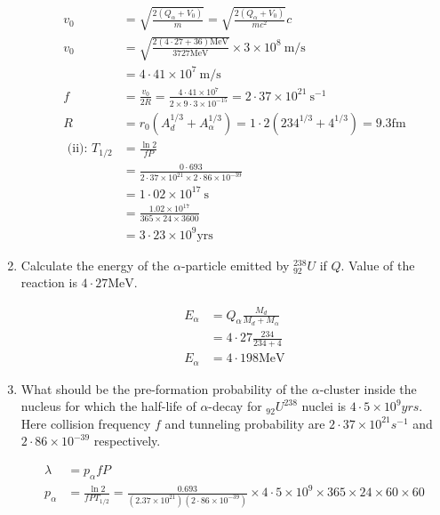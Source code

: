 \begin{enumerate}
\begin{answer}
\begin{align*}
		v_0&=\sqrt{\frac{2\left(Q_\alpha+V_0\right)}{m}}=\sqrt{\frac{2\left(Q_\alpha+V_0\right)}{m c^2}} c \\
		v_0&=\sqrt{\frac{2(4 \cdot 27+36) \mathrm{MeV}}{3727 \mathrm{MeV}}} \times 3 \times 10^8 \mathrm{~m} / \mathrm{s} \\
		&=4 \cdot 41 \times 10^7 \mathrm{~m} / \mathrm{s} \\
		f&=\frac{v_0}{2 R}=\frac{4 \cdot 41 \times 10^7}{2 \times 9 \cdot 3 \times 10^{-15}}=2 \cdot 37 \times 10^{21} \mathrm{~s}^{-1} \\
		R&=r_0\left(A_d^{1 / 3}+A_\alpha^{1 / 3}\right)=1 \cdot 2\left(234^{1 / 3}+4^{1 / 3}\right)=9.3 \mathrm{fm}\\
		\text { (ii): } T_{1 / 2}&=\frac{\ln 2}{f P}\\
		&=\frac{0 \cdot 693}{2 \cdot 37 \times 10^{21} \times 2 \cdot 86 \times 10^{-39}}\\
		&=1 \cdot 02 \times 10^{17} \mathrm{~s} \\
		&=\frac{1.02 \times 10^{17}}{365 \times 24 \times 3600} \\
		&=3 \cdot 23 \times 10^9 \mathrm{yrs}
		\end{align*}
	\end{answer}
		\item  Calculate the energy of the $\alpha$-particle emitted by ${ }_{92}^{238} U$ if $Q$. Value of the reaction is $4 \cdot 27 \mathrm{MeV}$.
		\begin{answer}
			\begin{align*}
			E_\alpha&=Q_\alpha \frac{M_d}{M_d+M_\alpha} \\
			&=4 \cdot 27 \frac{234}{234+4} \\
			E_\alpha&=4 \cdot 198 \mathrm{MeV}
			\end{align*}
		\end{answer}
	\item  What should be the pre-formation probability of the $\alpha$-cluster inside the nucleus for which the half-life of $\alpha$-decay for ${ }_{92} U^{238}$ nuclei is $4 \cdot 5 \times 10^9 y r s$. Here collision frequency $f$ and tunneling probability are $2 \cdot 37 \times 10^{21} s^{-1}$ and $2 \cdot 86 \times 10^{-39}$ respectively.
	\begin{answer}
		\begin{align*}
		\lambda&=p_\alpha f P\\
		p_\alpha&=\frac{\ln 2}{f P T_{1 / 2}}=\frac{0.693}{\left(2.37 \times 10^{21}\right)\left(2 \cdot 86 \times 10^{-39}\right)} \times 4 \cdot 5 \times 10^9 \times 365 \times 24 \times 60 \times 60 \\

\end{align*}
\end{answer}
\end{enumerate}
